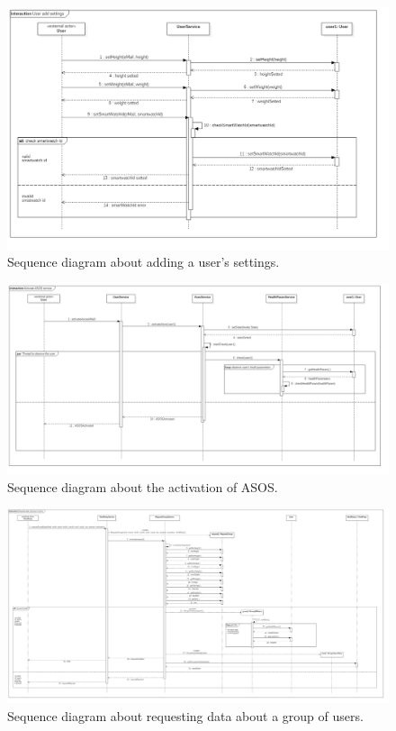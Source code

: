 \begin{figure}[h!]
	\includegraphics[width=1.0\textwidth]{./pictures/sequence_userSettings.png}\par
	\caption{Sequence diagram about adding a user's settings.}
\end{figure}
\FloatBarrier 

\begin{figure}[h!]
	\includegraphics[width=1.0\textwidth]{./pictures/sequence_activateAsos.png}\par
	\caption{Sequence diagram about the activation of ASOS.}
\end{figure}
\FloatBarrier 

\begin{figure}[h!]
	\includegraphics[width=1.0\textwidth]{./pictures/sequence_groupRequest.png}\par
	\caption{Sequence diagram about requesting data about a group of users.}
\end{figure}
\FloatBarrier 
